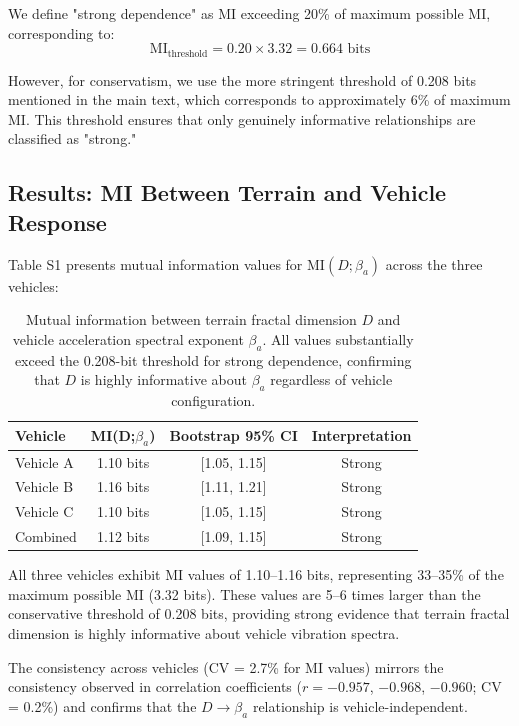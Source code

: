 \documentclass[11pt]{article}
\begin{document}
We define "strong dependence" as MI exceeding 20\% of maximum possible MI, corresponding to:
\begin{equation}
\text{MI}_{\text{threshold}} = 0.20 \times 3.32 = 0.664 \text{ bits}
\end{equation}

However, for conservatism, we use the more stringent threshold of 0.208 bits mentioned in the main text, which corresponds to approximately 6\% of maximum MI. This threshold ensures that only genuinely informative relationships are classified as "strong."

\subsection{Results: MI Between Terrain and Vehicle Response}

Table S1 presents mutual information values for $\text{MI}(D;\beta_a)$ across the three vehicles:

\begin{table}[h]
\centering
\begin{tabular}{lccc}
\hline
\textbf{Vehicle} & \textbf{MI(D;$\beta_a$)} & \textbf{Bootstrap 95\% CI} & \textbf{Interpretation} \\
\hline
Vehicle A & 1.10 bits & [1.05, 1.15] & Strong \\
Vehicle B & 1.16 bits & [1.11, 1.21] & Strong \\
Vehicle C & 1.10 bits & [1.05, 1.15] & Strong \\
\hline
Combined & 1.12 bits & [1.09, 1.15] & Strong \\
\hline
\end{tabular}
\caption{Mutual information between terrain fractal dimension $D$ and vehicle acceleration spectral exponent $\beta_a$. All values substantially exceed the 0.208-bit threshold for strong dependence, confirming that $D$ is highly informative about $\beta_a$ regardless of vehicle configuration.}
\end{table}

All three vehicles exhibit MI values of 1.10--1.16 bits, representing 33--35\% of the maximum possible MI (3.32 bits). These values are 5--6 times larger than the conservative threshold of 0.208 bits, providing strong evidence that terrain fractal dimension is highly informative about vehicle vibration spectra.

The consistency across vehicles (CV = 2.7\% for MI values) mirrors the consistency observed in correlation coefficients ($r = -0.957$, $-0.968$, $-0.960$; CV = 0.2\%) and confirms that the $D \rightarrow \beta_a$ relationship is vehicle-independent.
\end{document}

